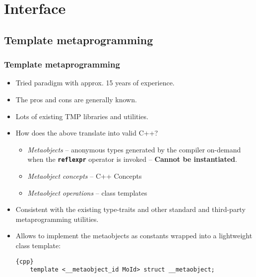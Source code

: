 \documentclass[compress,table,xcolor=table]{beamer}
\begin{document}
\section{Interface}

\subsection{Template metaprogramming}
\begin{frame}[fragile]
\frametitle{Template metaprogramming}
  \small
  \begin{itemize}
    \item Tried paradigm with approx. 15 years of experience.
    \item The pros and cons are generally known.
    \item Lots of existing TMP libraries and utilities.
    \item How does the above translate into valid C++?
    \begin{itemize}
      \footnotesize
      \item {\em Metaobjects} -- anonymous types generated by the compiler on-demand
      when the \texttt{\textbf{reflexpr}} operator is invoked --
      \textbf{Cannot be instantiated}.
      \item {\em Metaobject concepts} -- C++ Concepts
      \item {\em Metaobject operations} -- class templates
    \end{itemize}
    \item Consistent with the existing type-traits and other standard and
      third-party metaprogramming utilities.
    \item Allows to implement the metaobjects as constants wrapped into a
    lightweight class template:
    \begin{lstlisting}{cpp}
	template <__metaobject_id MoId> struct __metaobject;
    \end{lstlisting}
  \end{itemize}
\end{frame}
\end{document}
